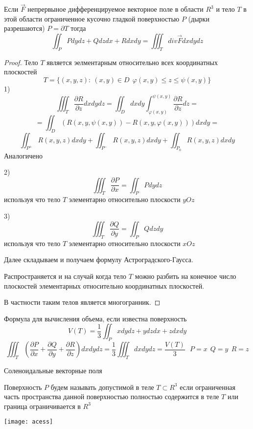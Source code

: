 \begin{theorem}
  Если $\vec F$ непрервыное дифференцируемое векторное поле в области $R^3$
  и тело $T$ в этой области ограниченное кусочно гладкой поверхностью $P$
  (дырки разрешаются) $P = \partial T$ тогда
  $$
  \iint_P P dy dz + Q dz dx + R dx dy =
  \iiint_T div \vec F dxdydz
  $$
\end{theorem}

\begin{proof}
  Тело $T$ является эелментарным относительно всех координатных плоскостей
  $$
  T = \{(x, y,z): ~ (x,y) \in D ~~ \varphi(x,y) \le z \le \psi(x,y)\}
  $$
  1)
  $$
  \iiint_T \frac{\partial R}{\partial z} dxdydz = \iint_D dxdy
  \int^{\psi(x,y)}_{\varphi(x,y)} \frac{\partial R}{\partial z} dz =
  $$
  $$
  = \iint_D (R(x,y, \psi(x,y)) - R(x,y, \varphi(x,y))) dx dy =
  $$
  $$
  \iint_{P^+} R(x,y,z) dx dy + \iint_{P^-} R(x,y,z) dxdy + \iint_{P_0}
  R(x,y,z) dxdy
  $$
  Аналогичено

  2)
  $$
  \iiint_T \frac{\partial P}{\partial x} = \iint_P P dydz
  $$
  используя что тело $T$ элементарно относительно плоскости $yOz$

  3)
  $$
  \iiint_T \frac{\partial Q}{\partial y} = \iint_P Q dzdy
  $$
  используя что тело $T$ элементарно относительно плоскости $xOz$

  Далее складываем и получаем формулу Астроградского-Гаусса.

  Распространяется и на случай когда тело $T$ можно разбить на конечное число
  плоскостей элементарных относительно координатных плоскостей.

  В частности таким телов является многогранник.
\end{proof}

\begin{block}[Следствие]
  Формула для вычисления объема, если известна поверхность
  $$
  V(T) = \frac{1}{3} \iint_P xdydz + ydzdx + zdxdy
  $$
  $$
  \iiint_T \left( \frac{\partial P}{\partial x} + \frac{\partial Q}{\partial y}
  + \frac{\partial R}{\partial z} \right) dxdydz = \frac{1}{3} \iiint_T dxdydz =
  \frac{V(T)}{3} ~~~ P = x ~~ Q = y ~~ R = z
  $$
\end{block}

\begin{title}[\Large]
  Соленоидальные векторные поля
\end{title}

\begin{define}
  Поверхность $P$ будем называть допустимой в теле $T \subset R^3$ если
  ограниченная часть пространства данной поверхностью полностью содержится
  в теле $T$ или граница ограничивается в $R^3$

  \texttt{[image: acess]}
\end{define}

